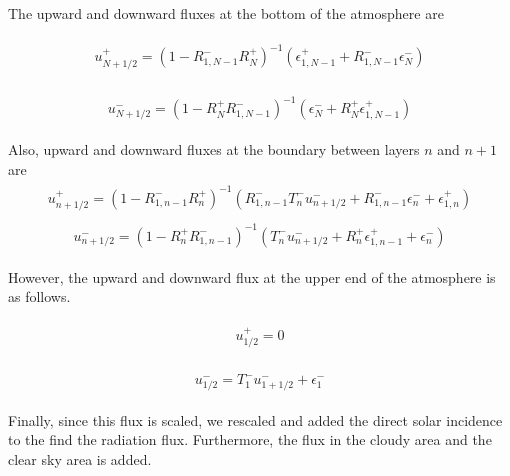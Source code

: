 The upward and downward fluxes at the bottom of the atmosphere are

\begin{eqnarray}
\begin{array}{l}
u_{N+1 / 2}^{+}=\left(1-R_{1, N-1}^{-} R_{N}^{+}\right)^{-1}\left(\epsilon_{1, N-1}^{+}+R_{1, N-1}^{-} \epsilon_{N}^{-}\right)
\end{array}
\end{eqnarray}

\begin{eqnarray}
\begin{array}{l}
u_{N+1 / 2}^{-}=\left(1-R_{N}^{+} R_{1, N-1}^{-}\right)^{-1}\left(\epsilon_{N}^{-}+R_{N}^{+} \epsilon_{1, N-1}^{+}\right)
\end{array}
\end{eqnarray}

Also, upward and downward fluxes at the boundary between layers \(n\) and \(n+1\) are \begin{eqnarray}
\begin{array}{l}
u_{n+1 / 2}^{+}=\left(1-R_{1, n-1}^{-} R_{n}^{+}\right)^{-1}\left(R_{1, n-1}^{-} T_{n}^{-} u_{n+1 / 2}^{-}+R_{1, n-1}^{-} \epsilon_{n}^{-}+\epsilon_{1, n}^{+}\right)
\end{array}
\end{eqnarray} \begin{eqnarray}
\begin{array}{l}
u_{n+1 / 2}^{-}=\left(1-R_{n}^{+} R_{1, n-1}^{-}\right)^{-1}\left(T_{n}^{-} u_{n+1 / 2}^{-}+R_{n}^{+} \epsilon_{1, n-1}^{+}+\epsilon_{n}^{-}\right)
\end{array}
\end{eqnarray}

However, the upward and downward flux at the upper end of the atmosphere is as follows.

\begin{eqnarray}
\begin{array}{l}
u_{1 / 2}^{+}=0
\end{array}
\end{eqnarray}

\begin{eqnarray}
\begin{array}{l}
u_{1 / 2}^{-}=T_{1}^{-} u_{1+1 / 2}^{-}+\epsilon_{1}^{-}
\end{array}
\end{eqnarray}

Finally, since this flux is scaled, we rescaled and added the direct solar incidence to the find the radiation flux. Furthermore, the flux in the cloudy area and the clear sky area is added.

